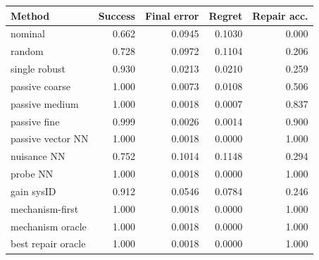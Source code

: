 \begin{tabular}{lrrrr}
\toprule
Method & Success & Final error & Regret & Repair acc. \\
\midrule
nominal & 0.662 & 0.0945 & 0.1030 & 0.000 \\
random & 0.728 & 0.0972 & 0.1104 & 0.206 \\
single robust & 0.930 & 0.0213 & 0.0210 & 0.259 \\
passive coarse & 1.000 & 0.0073 & 0.0108 & 0.506 \\
passive medium & 1.000 & 0.0018 & 0.0007 & 0.837 \\
passive fine & 0.999 & 0.0026 & 0.0014 & 0.900 \\
passive vector NN & 1.000 & 0.0018 & 0.0000 & 1.000 \\
nuisance NN & 0.752 & 0.1014 & 0.1148 & 0.294 \\
probe NN & 1.000 & 0.0018 & 0.0000 & 1.000 \\
gain sysID & 0.912 & 0.0546 & 0.0784 & 0.246 \\
mechanism-first & 1.000 & 0.0018 & 0.0000 & 1.000 \\
mechanism oracle & 1.000 & 0.0018 & 0.0000 & 1.000 \\
best repair oracle & 1.000 & 0.0018 & 0.0000 & 1.000 \\
\bottomrule
\end{tabular}
